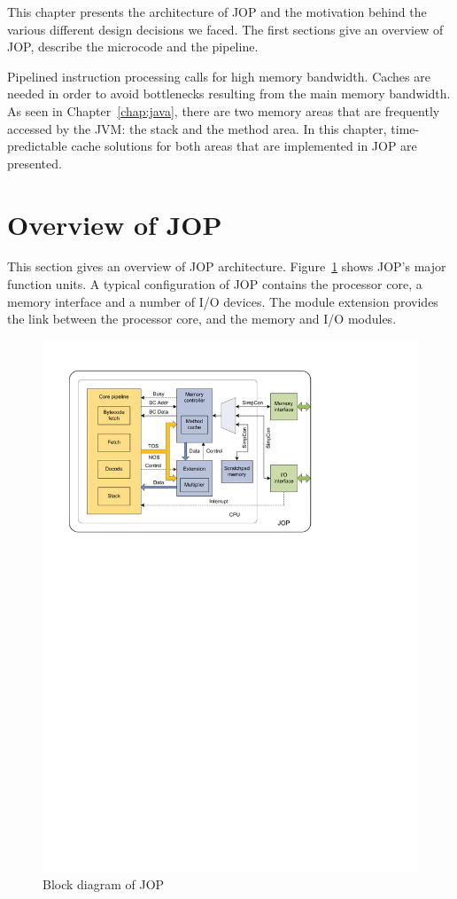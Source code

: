 This chapter presents the architecture of JOP and the motivation
behind the various different design decisions we faced. The first
sections give an overview of JOP, describe the microcode and the
pipeline.

Pipelined instruction processing calls for high memory bandwidth.
Caches are needed in order to avoid bottlenecks resulting from the
main memory bandwidth. As seen in Chapter~\ref{chap:java}, there are
two memory areas that are frequently accessed by the JVM: the stack
and the method area. In this chapter, time-predictable cache
solutions for both areas that are implemented in JOP are presented.

\section{Overview of JOP}

This section gives an overview of JOP architecture.
Figure~\ref{fig:arch:jop:block} shows JOP's major function units. A
typical configuration of JOP contains the processor core, a memory
interface and a number of I/O devices. The module extension provides
the link between the processor core, and the memory and I/O modules.

\begin{figure}[t]
    \centering
    \includegraphics{arch/arch_jop_block}
    \caption{Block diagram of JOP}
    \label{fig:arch:jop:block}
\end{figure}


